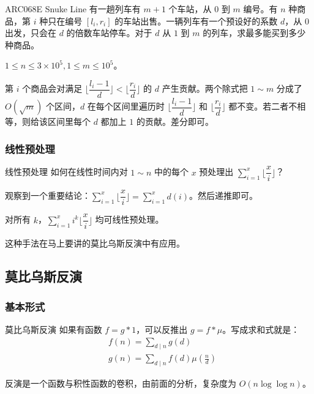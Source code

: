 \documentclass[../main.tex]{subfiles}
\begin{document}
\subsubsection{}

\begin{frame}{ARC068E Snuke Line}
有一趟列车有 $m+1$ 个车站，从 $0$ 到 $m$ 编号。有 $n$ 种商品，第 $i$ 种只在编号 $[l_i,r_i]$ 的车站出售。一辆列车有一个预设好的系数 $d$，从 $0$ 出发，只会在 $d$ 的倍数车站停车。对于 $d$ 从 $1$ 到 $m$ 的列车，求最多能买到多少种商品。

$1\le n\le 3\times10^5,1\le m\le 10^5$。\pause
\bigskip

第 $i$ 个商品会对满足 $\lfloor\dfrac{l_i-1}{d}\rfloor<\lfloor\dfrac{r_i}{d}\rfloor$ 的 $d$ 产生贡献。两个除式把 $1\sim m$ 分成了 $O(\sqrt m)$ 个区间，$d$ 在每个区间里遍历时 $\lfloor\dfrac{l_i-1}{d}\rfloor$ 和 $\lfloor\dfrac{r_i}{d}\rfloor$ 都不变。若二者不相等，则给该区间里每个 $d$ 都加上 $1$ 的贡献。差分即可。
\end{frame}

\subsubsection{线性预处理}

\begin{frame}{线性预处理}
如何在线性时间内对 $1\sim n$ 中的每个 $x$ 预处理出 $\sum\limits_{i=1}^x\lfloor\dfrac{x}{i}\rfloor$？\pause
\medskip

观察到一个重要结论：$\sum\limits_{i=1}^x\lfloor\dfrac{x}{i}\rfloor=\sum\limits_{i=1}^xd(i)$。然后递推即可。\pause

对所有 $k$，$\sum\limits_{i=1}^xi^k\lfloor\dfrac{x}{i}\rfloor$ 均可线性预处理。\pause

这种手法在马上要讲的莫比乌斯反演中有应用。
\end{frame}

\subsection{莫比乌斯反演}

\subsubsection{基本形式}

\begin{frame}{莫比乌斯反演}
如果有函数 $f=g*1$，可以反推出 $g=f*\mu$。写成求和式就是：
$$
\begin{aligned}
& f(n)=\sum_{d\mid n} g(d)\\
& g(n)=\sum_{d\mid n} f(d)\mu(\frac{n}{d})
\end{aligned}
$$\pause

反演是一个函数与积性函数的卷积，由前面的分析，复杂度为 $O(n\log\log n)$。
\end{frame}
\end{document}
